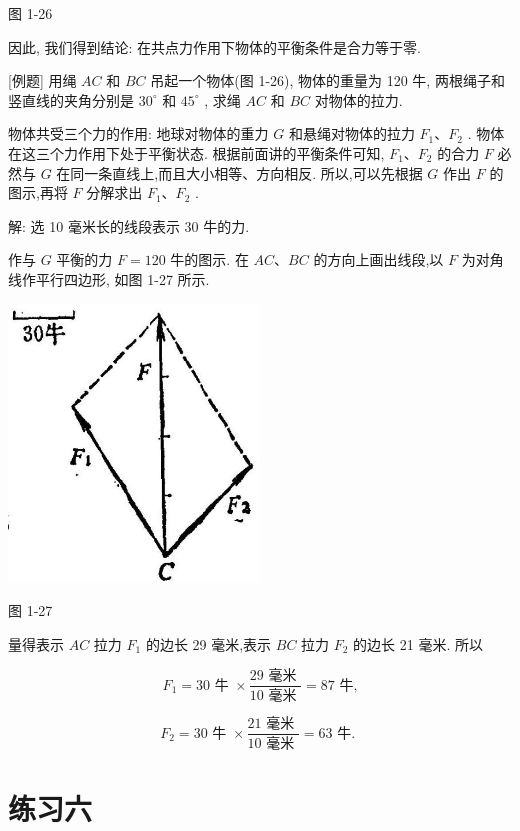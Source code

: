\documentclass[10pt]{article}
\begin{document}
图 1-26

因此, 我们得到结论: 在共点力作用下物体的平衡条件是合力等于零.

[例题] 用绳 \({AC}\) 和 \({BC}\) 吊起一个物体(图 1-26), 物体的重量为 120 牛, 两根绳子和竖直线的夹角分别是 \({30}^{ \circ }\) 和 \({45}^{ \circ }\) , 求绳 \({AC}\) 和 \({BC}\) 对物体的拉力.

物体共受三个力的作用: 地球对物体的重力 \(G\) 和悬绳对物体的拉力 \({F}_{1}\text{、}{F}_{2}\) . 物体在这三个力作用下处于平衡状态. 根据前面讲的平衡条件可知, \({F}_{1}\text{、}{F}_{2}\) 的合力 \(F\) 必然与 \(G\) 在同一条直线上,而且大小相等、方向相反. 所以,可以先根据 \(G\) 作出 \(F\) 的图示,再将 \(F\) 分解求出 \({F}_{1}\text{、}{F}_{2}\) .

解: 选 10 毫米长的线段表示 30 牛的力.

作与 \(G\) 平衡的力 \(F = {120}\) 牛的图示. 在 \({AC}\text{、}{BC}\) 的方向上画出线段,以 \(F\) 为对角线作平行四边形, 如图 1-27 所示.

\begin{center}
\includegraphics[max width=0.5\textwidth]{images/01912d55-147c-70aa-b0e0-1782a122f948_39_986758.jpg}
\end{center}

图 1-27

量得表示 \({AC}\) 拉力 \({F}_{1}\) 的边长 29 毫米,表示 \({BC}\) 拉力 \({F}_{2}\) 的边长 21 毫米. 所以

\[
{F}_{1} = {30}\text{ 牛 } \times \frac{{29}\text{ 毫米 }}{{10}\text{ 毫米 }} = {87}\text{ 牛,}
\]

\[
{F}_{2} = {30}\text{ 牛 } \times \frac{{21}\text{ 毫米 }}{{10}\text{ 毫米 }} = {63}\text{ 牛. }
\]

\section*{练习六}
\end{document}
